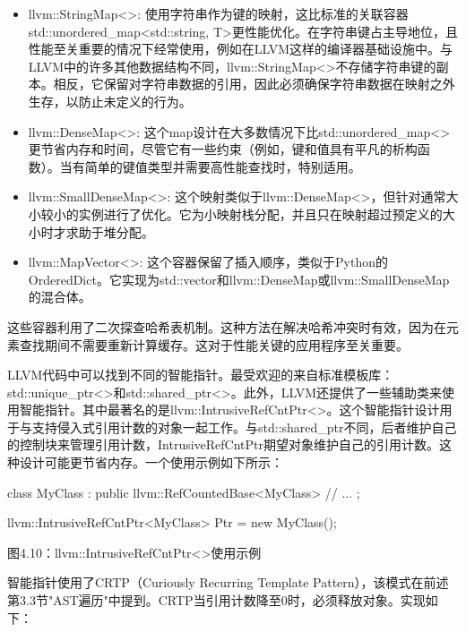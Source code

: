 \begin{itemize}
\item
llvm::StringMap<>: 使用字符串作为键的映射，这比标准的关联容器std::unordered\_map<std::string, T>更性能优化。在字符串键占主导地位，且性能至关重要的情况下经常使用，例如在LLVM这样的编译器基础设施中。与LLVM中的许多其他数据结构不同，llvm::StringMap<>不存储字符串键的副本。相反，它保留对字符串数据的引用，因此必须确保字符串数据在映射之外生存，以防止未定义的行为。

\item
llvm::DenseMap<>: 这个map设计在大多数情况下比std::unordered\_map<>更节省内存和时间，尽管它有一些约束（例如，键和值具有平凡的析构函数）。当有简单的键值类型并需要高性能查找时，特别适用。

\item
llvm::SmallDenseMap<>: 这个映射类似于llvm::DenseMap<>，但针对通常大小较小的实例进行了优化。它为小映射栈分配，并且只在映射超过预定义的大小时才求助于堆分配。

\item
llvm::MapVector<>: 这个容器保留了插入顺序，类似于Python的OrderedDict。它实现为std::vector和llvm::DenseMap或llvm::SmallDenseMap的混合体。
\end{itemize}

这些容器利用了二次探查哈希表机制。这种方法在解决哈希冲突时有效，因为在元素查找期间不需要重新计算缓存。这对于性能关键的应用程序至关重要。


LLVM代码中可以找到不同的智能指针。最受欢迎的来自标准模板库：std::unique\_ptr<>和std::shared\_ptr<>。此外，LLVM还提供了一些辅助类来使用智能指针。其中最著名的是llvm::IntrusiveRefCntPtr<>。这个智能指针设计用于与支持侵入式引用计数的对象一起工作。与std::shared\_ptr不同，后者维护自己的控制块来管理引用计数，IntrusiveRefCntPtr期望对象维护自己的引用计数。这种设计可能更节省内存。一个使用示例如下所示：

\begin{cpp}
class MyClass : public llvm::RefCountedBase<MyClass> {
  // ...
};

llvm::IntrusiveRefCntPtr<MyClass> Ptr = new MyClass();
\end{cpp}

\begin{center}
图4.10：llvm::IntrusiveRefCntPtr<>使用示例
\end{center}

智能指针使用了CRTP（Curiously Recurring Template Pattern），该模式在前述第3.3节"AST遍历"中提到。CRTP当引用计数降至0时，必须释放对象。实现如下：

